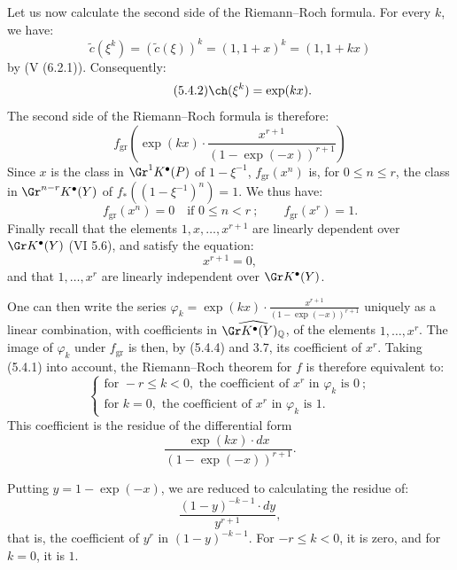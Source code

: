 %
Let us now calculate the second side of the Riemann--Roch formula. For every \(k\), we have:
\[
 \widetilde c(\xi^k)=(\widetilde c(\xi))^k=(1,1+x)^k=(1,1+kx)
\]
by (V (6.2.1)). Consequently:
\begin{equation}\tag{5.4.2}
 \ch(\xi^k)=\exp(kx).
\end{equation}
The second side of the Riemann--Roch formula is therefore:
\begin{equation}\tag{5.4.3}
 f_{\mathrm{gr}}\left(\exp(kx)\cdot
 \frac{x^{r+1}}{(1-\exp(-x))^{r+1}}\right)
\end{equation}
Since \(x\) is the class in \(\Gr^1K^{\bullet}(P)\) of \(1-\xi^{-1}\), \(f_{\mathrm{gr}}(x^n)\) is, for \(0\leq n\leq r\), the class in
\(\Gr^{n-r}K^{\bullet}(Y)\) of \(f_*((1-\xi^{-1})^n)=1\). We thus have:
\begin{equation}\tag{5.4.4}
 f_{\mathrm{gr}}(x^n)=0\quad\text{if }0\leq n<r~;\qquad
 f_{\mathrm{gr}}(x^r)=1.
\end{equation}
Finally recall that the elements \(1,x,\ldots,x^{r+1}\) are linearly dependent over \(\Gr K^{\bullet}(Y)\) (VI 5.6), and satisfy the equation:
\begin{equation}\tag{5.4.5}
 x^{r+1}=0,
\end{equation}
and that \(1,\ldots,x^r\) are linearly independent over \(\Gr K^{\bullet}(Y)\).

One can then write the series \(\varphi_k=\exp(kx)\cdot\frac{x^{r+1}}{(1-\exp(-x))^{r+1}}\) uniquely as a linear combination, with coefficients in
\(\widehat{\Gr K^{\bullet}(Y)_{\mathbb Q}}\), of the elements \(1,\ldots,x^r\). The image of \(\varphi_k\) under \(f_{\mathrm{gr}}\) is then, by (5.4.4) and 3.7, its coefficient of \(x^r\). Taking (5.4.1) into account, the Riemann--Roch theorem for \(f\) is therefore equivalent to:
\[
\left\{
\begin{array}{ll}
\text{for }-r\leq k<0,\text{ the coefficient of }x^r\text{ in }\varphi_k\text{ is }0~;\\
\text{for }k=0,\text{ the coefficient of }x^r\text{ in }\varphi_k\text{ is }1.
\end{array}
\right.
\tag{RR}
\]
This coefficient is the residue of the differential form
\[
 \frac{\exp(kx)\cdot dx}{(1-\exp(-x))^{r+1}}.
\]

%
Putting
\(y=1-\exp(-x)\), we are reduced to calculating the residue of:
\[
 \frac{(1-y)^{-k-1}\cdot dy}{y^{r+1}},
\]
that is, the coefficient of \(y^r\) in \((1-y)^{-k-1}\). For \(-r\leq k<0\), it is zero, and for \(k=0\), it is \(1\).

